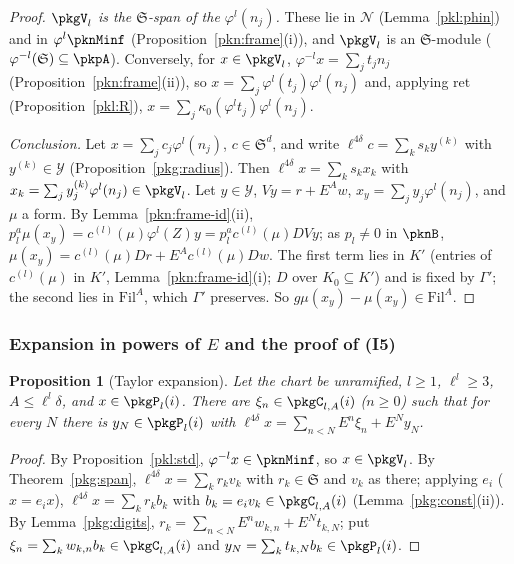 \documentclass[10pt]{amsart}
\newtheorem{proposition}[theorem]{Proposition}
\theoremstyle{definition}
\theoremstyle{remark}
\begin{document}
\begin{proof}
\emph{$\pkgV_l$ is the $\mathfrak S$-span of the $\varphi^l(n_j)$.} These lie in $\mathcal N$
(Lemma~\ref{pkl:phin}) and in $\varphi^l\pknMinf$ (Proposition~\ref{pkn:frame}(i)), and $\pkgV_l$ is an
$\mathfrak S$-module ($\varphi^{-l}(\mathfrak S)\subseteq\pkpA$). Conversely, for $x\in\pkgV_l$,
$\varphi^{-l}x=\sum_jt_jn_j$ (Proposition~\ref{pkn:frame}(ii)), so $x=\sum_j\varphi^l(t_j)\varphi^l(n_j)$ and,
applying $\mathrm{ret}$ (Proposition~\ref{pkl:R}), $x=\sum_j\kappa_0(\varphi^lt_j)\varphi^l(n_j)$.

\emph{Conclusion.} Let $x=\sum_jc_j\varphi^l(n_j)$, $c\in\mathfrak S^d$, and write $\ell^{4\delta}c=\sum_ks_ky^{(k)}$
with $y^{(k)}\in\mathcal Y$ (Proposition~\ref{pkg:radius}). Then $\ell^{4\delta}x=\sum_ks_kx_k$ with
$x_k=\sum_jy^{(k)}_j\varphi^l(n_j)\in\pkgV_l$. Let $y\in\mathcal Y$, $Vy=r+E^Aw$, $x_y=\sum_jy_j\varphi^l(n_j)$, and
$\mu$ a form. By Lemma~\ref{pkn:frame-id}(ii), $p_l^a\mu(x_y)=c^{(l)}(\mu)\varphi^l(Z)y=p_l^ac^{(l)}(\mu)DVy$; as
$p_l\ne0$ in $\pknB$, $\mu(x_y)=c^{(l)}(\mu)Dr+E^Ac^{(l)}(\mu)Dw$. The first term lies in $K'$ (entries of
$c^{(l)}(\mu)$ in $K'$, Lemma~\ref{pkn:frame-id}(i); $D$ over $K_0\subseteq K'$) and is fixed by $\Gamma'$; the
second lies in $\mathrm{Fil}^A$, which $\Gamma'$ preserves. So $g\mu(x_y)-\mu(x_y)\in\mathrm{Fil}^A$.
\end{proof}

\subsubsection{Expansion in powers of $E$ and the proof of (I5)}\label{pkg:ss-I5}

\begin{proposition}[Taylor expansion]\label{pkg:taylor}
Let the chart be unramified, $l\ge1$, $\ell^l\ge3$, $A\le\ell^l\delta$, and $x\in\pkgP_l(i)$. There are
$\xi_n\in\pkgC_{l,A}(i)$ ($n\ge0$) such that for every $N$ there is $y_N\in\pkgP_l(i)$ with
$\ell^{4\delta}x=\sum_{n<N}E^n\xi_n+E^Ny_N$.
\end{proposition}

\begin{proof}
By Proposition~\ref{pkl:std}, $\varphi^{-l}x\in\pknMinf$, so $x\in\pkgV_l$. By Theorem~\ref{pkg:span},
$\ell^{4\delta}x=\sum_kr_kv_k$ with $r_k\in\mathfrak S$ and $v_k$ as there; applying $e_i$ ($x=e_ix$),
$\ell^{4\delta}x=\sum_kr_kb_k$ with $b_k=e_iv_k\in\pkgC_{l,A}(i)$ (Lemma~\ref{pkg:const}(ii)). By
Lemma~\ref{pkg:digits}, $r_k=\sum_{n<N}E^nw_{k,n}+E^Nt_{k,N}$; put $\xi_n=\sum_kw_{k,n}b_k\in\pkgC_{l,A}(i)$ and
$y_N=\sum_kt_{k,N}b_k\in\pkgP_l(i)$.
\end{proof}
\end{document}
